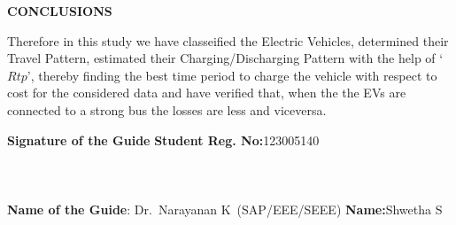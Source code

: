 	
	\begin{center}
		\Large{{\textbf{CONCLUSIONS}}}
	\end{center}
	
		\noindent Therefore in this study we have classeified the Electric Vehicles, determined their Travel Pattern, estimated their Charging/Discharging Pattern with the help of `$Rtp$', thereby finding the best time period to charge the vehicle with respect to cost for the considered data and have verified that, when the the EVs are connected to a strong bus the losses are less and viceversa.
	
	\vspace*{24pt}
	
		\noindent \textbf{Signature of the Guide} \hspace*{71mm} \textbf{Student Reg. No:}123005140\\
			\\
		\\
		\\
	\noindent \textbf{Name of the Guide}:{ Dr.~Narayanan K}~(SAP/EEE/SEEE) \hspace*{15mm} \textbf{Name:}Shwetha S
	\pagebreak
	\pagebreak
	
	
